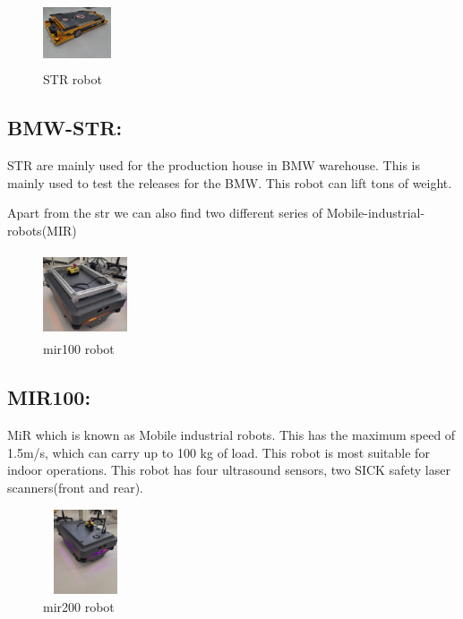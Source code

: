 	

\begin{figure}
	\centering
	\includegraphics[width=2cm,height=2cm]{images/str.jpeg}
	\caption{STR robot}
\end{figure}
\subsection{BMW-STR:}
STR are mainly \hspace{2cm}used for the\hspace{2cm} production house in BMW warehouse. This is mainly used \hspace{2cm}to test the releases for the\hspace{2cm} BMW. This robot can lift tons of weight. 

Apart from the str we can also find two different series of Mobile-industrial-robots(MIR)


\begin{figure} 
	\centering
	\includegraphics[width=2.5cm,height=2.5cm]{images/mir1.jpeg}
	\caption{mir100 robot}
\end{figure}
\subsection{MIR100:}
MiR which is known as Mobile industrial robots. This has the maximum speed of 1.5m/s, which can carry up to 100 kg of load. This robot is most suitable for indoor operations. This robot has four ultrasound sensors, two SICK safety laser scanners(front and rear).
	

\begin{figure}
	\centering		
	\includegraphics[width=2.5cm,height=2.5cm]{images/mir2.jpeg}
	\caption{mir200 robot}
\end{figure}
